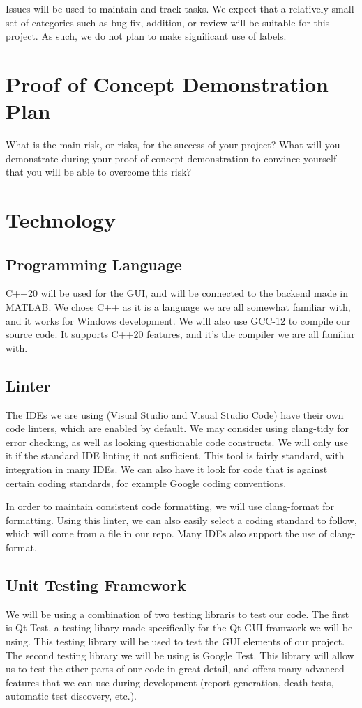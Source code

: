 \documentclass{article}
\begin{document}
Issues will be used to maintain and track tasks. We expect that a relatively small set of categories such as bug fix, addition, or review will be suitable for this project. As such, we do not plan to make significant use of labels.

\section{Proof of Concept Demonstration Plan}

What is the main risk, or risks, for the success of your project?  What will you
demonstrate during your proof of concept demonstration to convince yourself that
you will be able to overcome this risk?

\section{Technology}

\subsection{Programming Language}
C++20 will be used for the GUI, and will be connected to the backend made in MATLAB.
We chose C++ as it is a language we are all somewhat familiar with, and it works for
Windows development. We will also use GCC-12 to compile our source code. It supports C++20
features, and it's the compiler we are all familiar with.

\subsection{Linter}
The IDEs we are using (Visual Studio and Visual Studio Code) have their own code linters, which are enabled by default.
We may consider using clang-tidy for error checking, as well as looking questionable code constructs. We will
only use it if the standard IDE linting it not sufficient. This tool is fairly standard, with integration in many 
IDEs. We can also have it look for code that is against certain coding standards, for example Google coding conventions.

In order to maintain consistent code formatting, we will use clang-format for formatting. Using this linter, 
we can also easily select a coding standard to follow, which will come from a file in our repo. Many IDEs
also support the use of clang-format. 

\subsection{Unit Testing Framework}
We will be using a combination of two testing libraris to test our code. The first is Qt Test, a testing libary made specifically for the Qt GUI framwork we will be using. This testing library will be used to test the GUI elements of our project.
The second testing library we will be using is Google Test. This library will allow us to test the other parts of our code in great detail, and offers many advanced features that we can use during development (report generation, death tests, automatic test discovery, etc.).
\end{document}
